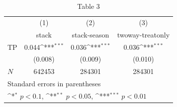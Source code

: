 \begin{table}[htbp]\centering
\def\sym#1{\ifmmode^{#1}\else\(^{#1}\)\fi}
\caption{Table 3}
\begin{tabular}{l*{3}{c}}
\hline\hline
            &\multicolumn{1}{c}{(1)}&\multicolumn{1}{c}{(2)}&\multicolumn{1}{c}{(3)}\\
            &\multicolumn{1}{c}{stack}&\multicolumn{1}{c}{stack-season}&\multicolumn{1}{c}{twoway-treatonly}\\
\hline
TP          &       0.044\sym{***}&       0.036\sym{***}&       0.036\sym{***}\\
            &     (0.008)         &     (0.009)         &     (0.010)         \\
\hline
\(N\)       &      642453         &      284301         &      284301         \\
\hline\hline
\multicolumn{4}{l}{\footnotesize Standard errors in parentheses}\\
\multicolumn{4}{l}{\footnotesize \sym{*} \(p<0.1\), \sym{**} \(p<0.05\), \sym{***} \(p<0.01\)}\\
\end{tabular}
\end{table}
